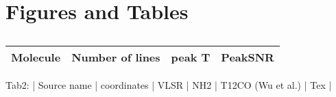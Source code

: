 \section{Figures and Tables}

\begin{table}
\caption{}
\begin{tabular}{|c|c|c|c|}
\hline
Molecule & Number of lines & peak T & PeakSNR\\
\hline
\hline
\end{tabular}
\end{table}

 Tab2: | Source name | coordinates | VLSR | NH2 | T12CO (Wu et al.) | Tex | 

 
  
  
  
  
  
  
  
  
  
  
  
  